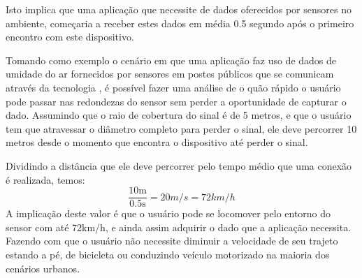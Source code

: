 Isto implica que uma aplicação que necessite de dados oferecidos por sensores no ambiente, começaria a receber estes dados em média 0.5 segundo após o primeiro encontro com este dispositivo.

Tomando como exemplo o cenário em que uma aplicação faz uso de dados de umidade do ar fornecidos por sensores em postes públicos que se comunicam através da tecnologia \ble, é possível fazer uma análise de o quão rápido o usuário pode passar nas redondezas do sensor sem perder a oportunidade de capturar o dado.
Assumindo que o raio de cobertura do sinal \bluetooth é de 5 metros, e que o usuário tem que atravessar o diâmetro completo para perder o sinal, ele deve percorrer 10 metros desde o momento que encontra o dispositivo até perder o sinal.

Dividindo a distância que ele deve percorrer pelo tempo médio que uma conexão é realizada, temos:
\[
	\frac{10\si{\meter}}{0.5\si{\second}} = 20\si{m/s} = 72\si{km/h}
\]
A implicação deste valor é que o usuário pode se locomover pelo entorno do sensor com até 72\si{km/h}, e ainda assim adquirir o dado que a aplicação necessita. Fazendo com que o usuário não necessite diminuir a velocidade de seu trajeto estando a pé, de bicicleta ou conduzindo veículo motorizado na maioria dos cenários urbanos.


